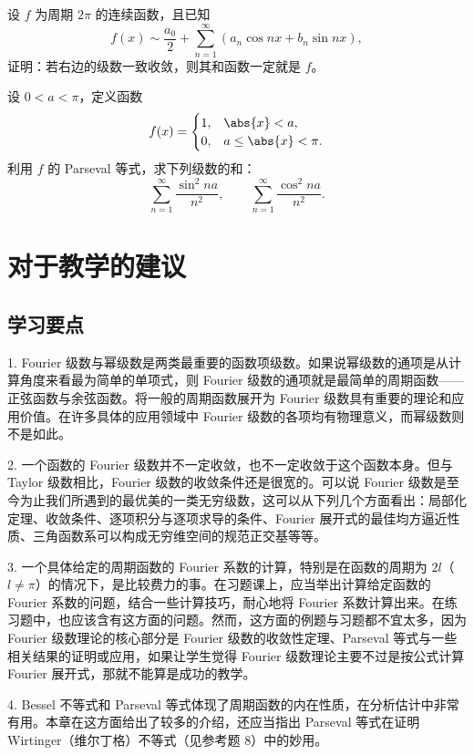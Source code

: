 \begin{xexercise}[9]
设 $f$ 为周期 $2\pi$ 的连续函数，且已知
  \[
    f(x)\sim\frac{a_0}{2}+\sum_{n=1}^{\infty}(a_n\cos nx+b_n\sin nx),
  \]
  证明：若右边的级数一致收敛，则其和函数一定就是 $f$。
\end{xexercise}

\begin{xexercise}[10]
设 $0<a<\pi$，定义函数
  \[
    f(x)=\begin{cases}
      1,&\abs{x}<a,\\
      0,&a\le\abs{x}<\pi.
    \end{cases}
  \]
  利用 $f$ 的 Parseval 等式，求下列级数的和：
  \[
    \sum_{n=1}^{\infty}\frac{\sin^2na}{n^2},\qquad
    \sum_{n=1}^{\infty}\frac{\cos^2na}{n^2}.
  \]
\end{xexercise}

\section{对于教学的建议}

\subsection{学习要点}

1. Fourier 级数与幂级数是两类最重要的函数项级数。如果说幂级数的通项是从计算角度来看最为简单的单项式，则 Fourier 级数的通项就是最简单的周期函数——正弦函数与余弦函数。将一般的周期函数展开为 Fourier 级数具有重要的理论和应用价值。在许多具体的应用领域中 Fourier 级数的各项均有物理意义，而幂级数则不是如此。

2. 一个函数的 Fourier 级数并不一定收敛，也不一定收敛于这个函数本身。但与 Taylor 级数相比，Fourier 级数的收敛条件还是很宽的。可以说 Fourier 级数是至今为止我们所遇到的最优美的一类无穷级数，这可以从下列几个方面看出：局部化定理、收敛条件、逐项积分与逐项求导的条件、Fourier 展开式的最佳均方逼近性质、三角函数系可以构成无穷维空间的规范正交基等等。

3. 一个具体给定的周期函数的 Fourier 系数的计算，特别是在函数的周期为 $2l$（$l\ne\pi$）的情况下，是比较费力的事。在习题课上，应当举出计算给定函数的 Fourier 系数的问题，结合一些计算技巧，耐心地将 Fourier 系数计算出来。在练习题中，也应该含有这方面的问题。然而，这方面的例题与习题都不宜太多，因为 Fourier 级数理论的核心部分是 Fourier 级数的收敛性定理、Parseval 等式与一些相关结果的证明或应用，如果让学生觉得 Fourier 级数理论主要不过是按公式计算 Fourier 展开式，那就不能算是成功的教学。

4. Bessel 不等式和 Parseval 等式体现了周期函数的内在性质，在分析估计中非常有用。本章在这方面给出了较多的介绍，还应当指出 Parseval 等式在证明 Wirtinger（维尔丁格）不等式（见参考题 8）中的妙用。

